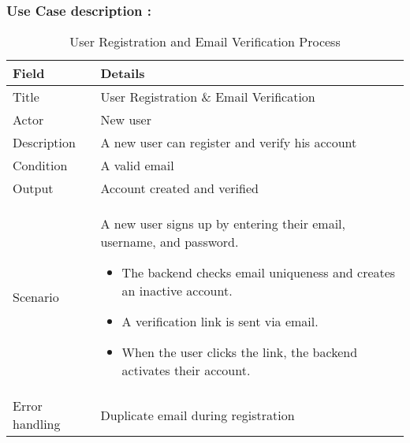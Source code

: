 \subsubsection{Use Case description : }
\begin{table}[h]
\centering
\begin{tabular}{|p{3cm}|p{10cm}|}
\hline
\textbf{Field} & \textbf{Details} \\
\hline
Title & User Registration \& Email Verification \\
\hline
Actor & New user \\
\hline
Description & A new user can register and verify his account \\
\hline
Condition & A valid email \\
\hline
Output & Account created and verified \\
\hline
Scenario & A new user signs up by entering their email, username, and password.
\begin{itemize}
\item The backend checks email uniqueness and creates an inactive account.
\item A verification link is sent via email.
\item When the user clicks the link, the backend activates their account.
\end{itemize} \\
\hline
Error handling & Duplicate email during registration \\
\hline
\end{tabular}
\caption{User Registration and Email Verification Process}
\label{tab:user_registration}
\end{table}

